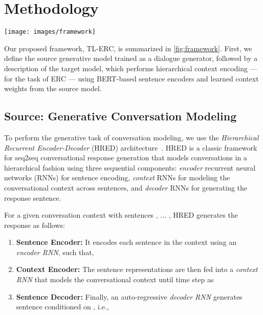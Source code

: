 \documentclass[preprint,3pt]{elsarticle}
\begin{document}
\section{Methodology} \label{sec:model_design}


\begin{figure*}[t]
	\centering
	\texttt{[image: images/framework]}
	\caption{\footnotesize{Proposed framework for ERC using TL parameters. The model on the left is a conversational response generator which is used as a pre-trained model. The parameters are transferred to the target model as shown on the right side.}}
	\label{fig:framework}
\end{figure*}


Our proposed framework, TL-ERC, is summarized in \cref{fig:framework}. First, we define the source generative model trained as a dialogue generator, followed by a description of the target model, which performs hierarchical context encoding --- for the task of ERC --- using BERT-based sentence encoders and learned context weights from the source model.



\subsection{Source: Generative Conversation Modeling} To perform the generative task of conversation modeling, we use the \textit{Hierarchical Recurrent Encoder-Decoder} (HRED) architecture~\cite{serban2016building}. HRED is a classic framework for seq2seq conversational response generation that models conversations in a hierarchical fashion using three sequential components: \textit{encoder} recurrent neural networks (RNNs) for sentence encoding, \textit{context} RNNs for modeling the conversational context across sentences, and \textit{decoder} RNNs for generating the response sentence. 

For a given conversation context with sentences , ... , HRED generates the response  as follows: 

	\begin{enumerate}[leftmargin=*]
		\item \textbf{Sentence Encoder:} It encodes each sentence in the context using an \textit{encoder RNN}, such that,
			
		
		\item \textbf{Context Encoder:} The sentence representations are then fed into a \textit{context RNN} that models the conversational context until time step  as 
			
		
		\item \textbf{Sentence Decoder:} Finally, an auto-regressive \textit{decoder RNN} generates sentence  conditioned on , i.e., 
			
			
	\end{enumerate}
\end{document}
